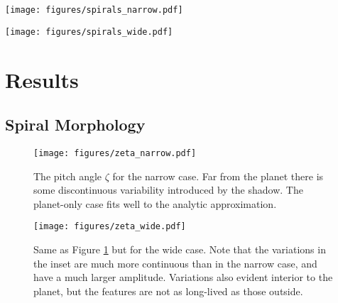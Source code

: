 \documentclass[twocolumn]{aastex631}
\begin{document}
\begin{figure*}
    \texttt{[image: figures/spirals\_narrow.pdf]}
    
    \caption{
        Spiral patterns observed after 99.25 orbits in the narrow shadow case. Shown is the density anomaly for every case.
        The third panel from the left shows the residuals after subtracting the first panel from the second. Plotted on the two
        rightmost panels are the locations identified as being at the peak of the spiral. Note that the color scale on the leftmost
        two panels has been scaled so that all panels can share the same colorbar.
    }
    \label{fig:sp_narrow}
\end{figure*}

\begin{figure*}
    \texttt{[image: figures/spirals\_wide.pdf]}
    \caption{ Same as Figure \ref{fig:sp_narrow} but for the wide shadow case.}
    \label{fig:sp_wide}
\end{figure*}

\section{Results}
\label{sec:results}

\subsection{Spiral Morphology}

\begin{figure}
    \begin{center}
        \texttt{[image: figures/zeta\_narrow.pdf]}
        \caption{
            The pitch angle $\zeta$ for the narrow case. Far from the planet there is some discontinuous variability introduced by the shadow.
            The planet-only case fits well to the analytic approximation.
        }
        \label{fig:zeta_narrow}
    \end{center}
\end{figure}


\begin{figure}
    \begin{center}
        \texttt{[image: figures/zeta\_wide.pdf]}
        \caption{
            Same as Figure \ref{fig:zeta_narrow} but for the wide case. Note that the variations in the inset are much more continuous than in the
            narrow case, and have a much larger amplitude. Variations also evident interior to the planet, but the features are not as long-lived
            as those outside.
        }
        \label{fig:zeta_wide}
    \end{center}
\end{figure}
\end{document}
